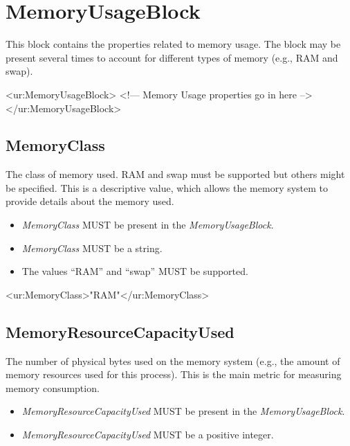 
\section{MemoryUsageBlock}

This block contains the properties related to memory usage. The block may be present several times to account for different types of memory (e.g., RAM and swap).

\begin{XMLexample}
<ur:MemoryUsageBlock>
<!— Memory Usage properties go in here -->
</ur:MemoryUsageBlock>
\end{XMLexample}






\subsection{MemoryClass}

The class of memory used. RAM and swap must be supported but others might be specified. This is a descriptive value, which allows the memory system to provide details about the memory used.

\begin{itemize}
\item \emph{MemoryClass} MUST be present in the \emph{MemoryUsageBlock}.
\item \emph{MemoryClass} MUST be a string.
\item The values ``RAM'' and ``swap'' MUST be supported.
\end{itemize}

\begin{XMLexample}
<ur:MemoryClass>"RAM"</ur:MemoryClass>
\end{XMLexample}






\subsection{MemoryResourceCapacityUsed}

The number of physical bytes used on the memory system (e.g., the amount of memory resources used for this process). This is the main metric for measuring memory consumption.

\begin{itemize}
\item \emph{MemoryResourceCapacityUsed} MUST be present in the \emph{MemoryUsageBlock}.
\item \emph{MemoryResourceCapacityUsed} MUST be a positive integer.
\end{itemize}

